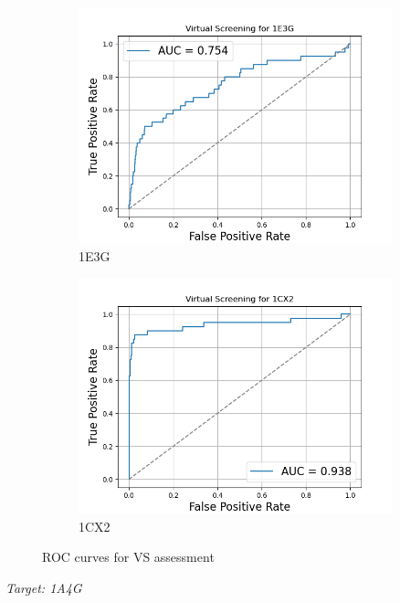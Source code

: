 \documentclass[a4paper,10pt]{article}
\begin{document}
\begin{figure}[h!]
  \begin{subfigure}{0.45\linewidth}
    \includegraphics[width=\linewidth]{figures/ROC_1E3G.png}
    \caption{1E3G}
    \label{fig:c}
  \end{subfigure}
  \hfill
  \begin{subfigure}{0.45\linewidth}
    \includegraphics[width=\linewidth]{figures/ROC_1CX2.png}
    \caption{1CX2}
    \label{fig:d}
  \end{subfigure}

  \caption{ROC curves for VS assessment}
  \label{fig:ROCs}
\end{figure}



\textit{Target: 1A4G} 
\end{document}

